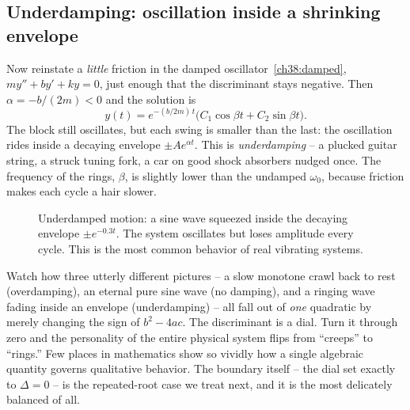 \subsection*{Underdamping: oscillation inside a shrinking envelope}

Now reinstate a \emph{little} friction in the damped oscillator~\eqref{ch38:damped},
$m y'' + b y' + k y = 0$, just enough that the discriminant stays negative. Then
$\alpha = -b/(2m) < 0$ and the solution is
\[
  y(t) = e^{-(b/2m)\,t}\big(C_1 \cos\beta t + C_2 \sin\beta t\big).
\]
The block still oscillates, but each swing is smaller than the last: the
oscillation rides inside a decaying envelope $\pm A e^{\alpha t}$. This is
\emph{underdamping} -- a plucked guitar string, a struck tuning fork, a car on
good shock absorbers nudged once. The frequency of the rings, $\beta$, is
slightly lower than the undamped $\omega_0$, because friction makes each cycle a
hair slower.

\begin{figure}[H]
\centering
{}
\caption{Underdamped motion: a sine wave squeezed inside the decaying envelope
$\pm e^{-0.3t}$. The system oscillates but loses amplitude every cycle. This is
the most common behavior of real vibrating systems.}
\label{ch38:fig-underdamped}
\end{figure}

\begin{aestheticbox}
Watch how three utterly different pictures -- a slow monotone crawl back to rest
(overdamping), an eternal pure sine wave (no damping), and a ringing wave fading
inside an envelope (underdamping) -- all fall out of \emph{one} quadratic by
merely changing the sign of $b^2 - 4ac$. The discriminant is a dial. Turn it
through zero and the personality of the entire physical system flips from
``creeps'' to ``rings.'' Few places in mathematics show so vividly how a single
algebraic quantity governs qualitative behavior. The boundary itself -- the dial
set exactly to $\Delta = 0$ -- is the repeated-root case we treat next, and it is
the most delicately balanced of all.
\end{aestheticbox}


